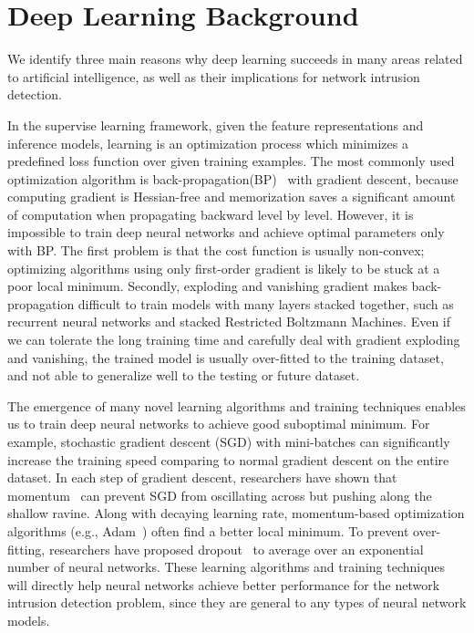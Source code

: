 \section{Deep Learning Background}
We identify three main reasons why deep learning succeeds in many areas related
to artificial intelligence, as well as their implications for network intrusion detection.

In the supervise learning framework, given the feature representations and inference models,
learning is an optimization process which minimizes a predefined loss function
over given training examples.
The most commonly used optimization algorithm is back-propagation(BP)~\cite{Backpropagation} with gradient descent,
because computing gradient is Hessian-free and memorization saves a significant amount of computation when
propagating backward level by level.
However, it is impossible to train deep neural networks and achieve optimal parameters only with BP.
The first problem is that the cost function is usually non-convex;
optimizing algorithms using only first-order gradient is likely to be stuck at a poor local minimum.
Secondly, exploding and vanishing gradient makes back-propagation difficult to train models with many layers stacked together, such as recurrent neural networks and stacked Restricted Boltzmann Machines.
Even if we can tolerate the long training time and carefully deal with gradient exploding and vanishing,
the trained model is usually over-fitted to the training dataset, and not able to generalize well to the testing or future dataset.

The emergence of many novel learning algorithms and training techniques enables us to train deep
neural networks to achieve good suboptimal minimum.
For example, stochastic gradient descent (SGD) with mini-batches can significantly increase the training speed comparing
to normal gradient descent on the entire dataset.
In each step of gradient descent, researchers have shown that momentum~\cite{Momentum} can
prevent SGD from oscillating across but pushing along the shallow ravine.
Along with decaying learning rate, momentum-based optimization algorithms (e.g., Adam~\cite{Adam}) often find a better local minimum.
To prevent over-fitting, researchers have proposed dropout~\cite{Dropout} to average over an exponential number of neural networks.
These learning algorithms and training techniques will directly help neural networks achieve
better performance for the network intrusion detection problem,
since they are general to any types of neural network models.

